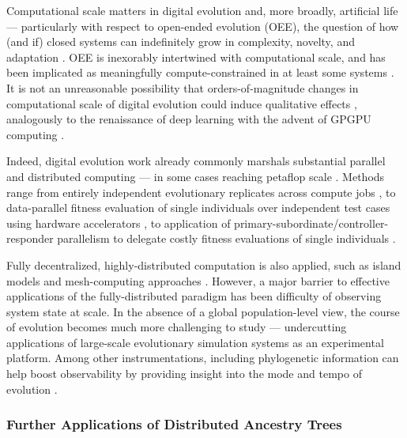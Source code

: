 Computational scale matters in digital evolution and, more broadly, artificial life \citep{ackley2014indefinitely} --- particularly with respect to open-ended evolution (OEE), the question of how (and if) closed systems can indefinitely grow in complexity, novelty, and adaptation \citep{taylor2016open}.
OEE is inexorably intertwined with computational scale, and has been implicated as meaningfully compute-constrained in at least some systems \citep{channon2019maximum}.
It is not an unreasonable possibility that orders-of-magnitude changes in computational scale of digital evolution could induce qualitative effects \citep{moreno2022engineering}, analogously to the renaissance of deep learning with the advent of GPGPU computing \citep{krizhevsky2012imagenet}.

Indeed, digital evolution work already commonly marshals substantial parallel and distributed computing  --- in some cases reaching petaflop scale \citep{gilbert2015artificial}.
Methods range from entirely independent evolutionary replicates across compute jobs \citep{dolson2017spatial, hornby2006automated}, to data-parallel fitness evaluation of single individuals over independent test cases using hardware accelerators \citep{harding2007fast_springer, langdon2019continuous}, to application of primary-subordinate/controller-responder parallelism to delegate costly fitness evaluations of single individuals \citep{cantu2001master,miikkulainen2019evolving}.

Fully decentralized, highly-distributed computation is also applied, such as island models \citep{bennett1999building,schulte2010genetic} and mesh-computing approaches \citep{ackley2018digital,moreno2021conduit}.
However, a major barrier to effective applications of the fully-distributed paradigm has been difficulty of observing system state at scale.
In the absence of a global population-level view, the course of evolution becomes much more challenging to study --- undercutting applications of large-scale evolutionary simulation systems as an experimental platform.
Among other instrumentations, including phylogenetic information can help boost observability by providing insight into the mode and tempo of evolution \citep{dolson2020interpreting}.

\subsubsection{Further Applications of Distributed Ancestry Trees}

